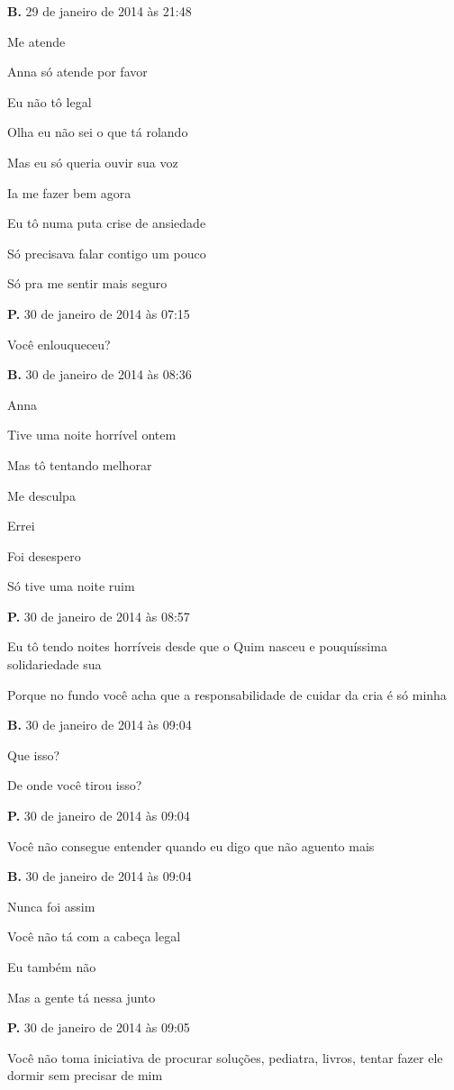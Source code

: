 {\parindent0pt\parskip1pt\raggedright
\textbf{B.} 29 de janeiro de 2014 às 21:48

Me atende

Anna só atende por favor

Eu não tô legal

Olha eu não sei o que tá rolando

Mas eu só queria ouvir sua voz

Ia me fazer bem agora

Eu tô numa puta crise de ansiedade

Só precisava falar contigo um pouco

Só pra me sentir mais seguro

\textbf{P.} 30 de janeiro de 2014 às 07:15

Você enlouqueceu?

\textbf{B.} 30 de janeiro de 2014 às 08:36

Anna

Tive uma noite horrível ontem

Mas tô tentando melhorar

Me desculpa

Errei

Foi desespero

Só tive uma noite ruim

\textbf{P.} 30 de janeiro de 2014 às 08:57

Eu tô tendo noites horríveis desde que o Quim nasceu e pouquíssima
solidariedade sua

Porque no fundo você acha que a responsabilidade de cuidar da cria é só
minha

\textbf{B.} 30 de janeiro de 2014 às 09:04

Que isso?

De onde você tirou isso?

\textbf{P.} 30 de janeiro de 2014 às 09:04

Você não consegue entender quando eu digo que não aguento mais

\textbf{B.} 30 de janeiro de 2014 às 09:04

Nunca foi assim

Você não tá com a cabeça legal

Eu também não

Mas a gente tá nessa junto

\textbf{P.} 30 de janeiro de 2014 às 09:05

Você não toma iniciativa de procurar soluções, pediatra, livros, tentar
fazer ele dormir sem precisar de mim

}
